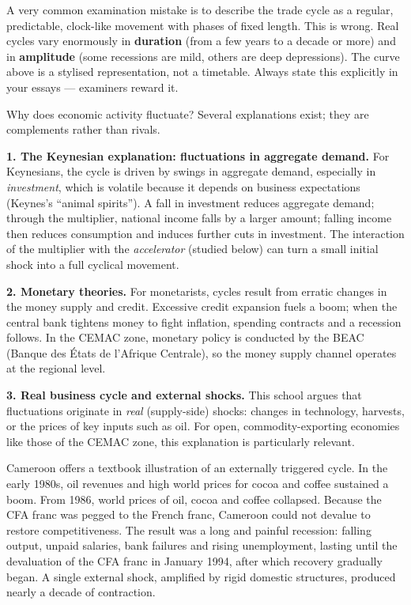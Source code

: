 \documentclass[11pt]{article}
\newcommand{\cle}[1]{{\popxbold\color{popdark}#1}}
\newcounter{popsec}
\newcounter{popsub}
\newcommand{\courssub}[1]{%
  \stepcounter{popsub}%
  \par\vspace{9pt}\noindent{\popxbold\fontsize{11.5}{13}\selectfont\color{popink}{\color{poporange}\thepopsec.\thepopsub}\hspace{6pt}#1}\par\nopagebreak\vspace{4pt}
}
\begin{document}
\begin{attention}
A very common examination mistake is to describe the trade cycle as a regular, predictable, clock-like movement with phases of fixed length. This is wrong. Real cycles vary enormously in \textbf{duration} (from a few years to a decade or more) and in \textbf{amplitude} (some recessions are mild, others are deep depressions). The curve above is a stylised representation, not a timetable. Always state this explicitly in your essays --- examiners reward it.
\end{attention}

\courssub{Causes of the Trade Cycle}

Why does economic activity fluctuate? Several explanations exist; they are complements rather than rivals.

\textbf{1. The Keynesian explanation: fluctuations in aggregate demand.} For Keynesians, the cycle is driven by swings in \cle{aggregate demand}, especially in \emph{investment}, which is volatile because it depends on business expectations (Keynes's ``animal spirits''). A fall in investment reduces aggregate demand; through the \cle{multiplier}, national income falls by a larger amount; falling income then reduces consumption and induces further cuts in investment. The interaction of the multiplier with the \emph{accelerator} (studied below) can turn a small initial shock into a full cyclical movement.

\textbf{2. Monetary theories.} For monetarists, cycles result from erratic changes in the \cle{money supply} and credit. Excessive credit expansion fuels a boom; when the central bank tightens money to fight inflation, spending contracts and a recession follows. In the CEMAC zone, monetary policy is conducted by the BEAC (Banque des États de l'Afrique Centrale), so the money supply channel operates at the regional level.

\textbf{3. Real business cycle and external shocks.} This school argues that fluctuations originate in \emph{real} (supply-side) shocks: changes in technology, harvests, or the prices of key inputs such as oil. For open, commodity-exporting economies like those of the CEMAC zone, this explanation is particularly relevant.

\begin{savaistu}
Cameroon offers a textbook illustration of an externally triggered cycle. In the early 1980s, oil revenues and high world prices for cocoa and coffee sustained a boom. From 1986, world prices of oil, cocoa and coffee collapsed. Because the CFA franc was pegged to the French franc, Cameroon could not devalue to restore competitiveness. The result was a long and painful recession: falling output, unpaid salaries, bank failures and rising unemployment, lasting until the devaluation of the CFA franc in January 1994, after which recovery gradually began. A single external shock, amplified by rigid domestic structures, produced nearly a decade of contraction.
\end{savaistu}
\end{document}

